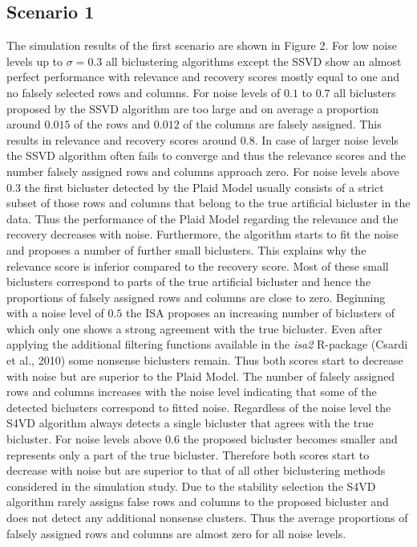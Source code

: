 \subsection{Scenario 1}
The simulation results of the first scenario are shown in Figure 2. For low noise levels up to $\sigma=0.3$ all biclustering algorithms except the SSVD show an almost perfect performance with relevance and recovery scores mostly equal to one and no falsely selected rows and columns. 
For noise levels of $0.1$ to $0.7$ all biclusters proposed by the SSVD algorithm are too large and on average a proportion around $0.015$ of the rows and $0.012$ of the columns are falsely assigned. This results in relevance and recovery scores around $0.8$. In case of larger noise levels the SSVD algorithm often fails to converge and thus the relevance scores and the number falsely assigned rows and columns approach zero. 
For noise levels above $0.3$ the first bicluster detected by the Plaid Model usually consists of a strict subset of those rows and columns that belong to the true artificial bicluster in the data. Thus the performance of the Plaid Model regarding the relevance and the recovery decreases with noise. 
Furthermore, the algorithm starts to fit the noise and proposes a number of further small biclusters. This explains why the relevance score is inferior compared to the recovery score. Most of these small biclusters correspond to parts of the true artificial bicluster and hence the proportions of falsely assigned rows and columns are close to zero. Beginning with a noise level of $0.5$ the ISA proposes an increasing number of biclusters of which only one shows a strong agreement with the true bicluster. Even after applying the additional filtering functions available in the \textit{isa2} R-package (Csardi et al., 2010) some nonsense biclusters remain. Thus both scores start to decrease with noise but are superior to the Plaid Model. The number of falsely assigned rows and columns increases with the noise level indicating that some of the detected biclusters correspond to fitted noise. Regardless of the noise level the S4VD algorithm always detects a single bicluster that agrees with the true bicluster. For noise levels above $0.6$ the proposed bicluster becomes smaller and represents only a part of the true bicluster. Therefore both scores start to decrease with noise but are superior to that of all other biclustering methods considered in the simulation study. Due to the stability selection the S4VD algorithm rarely assigns false rows and columns to the proposed bicluster and does not detect any additional nonsense clusters. Thus the average proportions of falsely assigned rows and columns are almost zero for all noise levels. 

